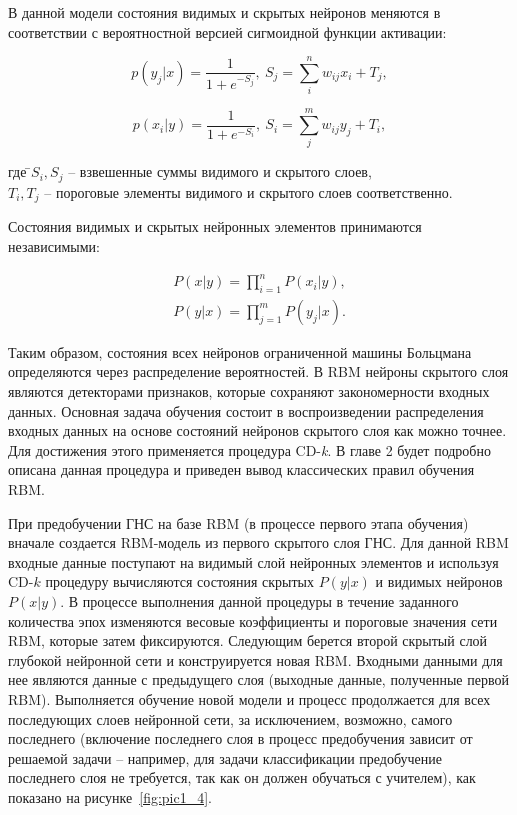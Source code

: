 В данной модели состояния видимых и скрытых нейронов меняются в соответствии с вероятностной версией сигмоидной функции активации:
	
\begin{equation}
	p(y_j\lvert x)=\frac{1}{1+e^{-S_j}},\ S_j=\sum_i^n w_{ij}x_i+T_j,
\end{equation}
	
\begin{equation}
	p(x_i\lvert y)=\frac{1}{1+e^{-S_i}},\ S_i=\sum_j^m w_{ij}y_j+T_i,
\end{equation}
\begin{tabbing}	
где \=$S_i, S_j$ -- взвешенные суммы видимого и скрытого слоев,\\
\>$T_i, T_j$ -- пороговые элементы видимого и скрытого слоев соответственно.
\end{tabbing}
	
Состояния видимых и скрытых нейронных элементов принимаются независимыми:
	
\begin{equation*}
\begin{aligned}
	P(x \lvert y) = \prod_{i=1}^n P(x_i \lvert y),\\
	P(y \lvert x) = \prod_{j=1}^m P(y_j \lvert x).
\end{aligned}	
\end{equation*}
	
Таким образом, состояния всех нейронов ограниченной машины Больцмана определяются через распределение вероятностей. В RBM нейроны скрытого слоя являются детекторами признаков, которые сохраняют закономерности входных данных. Основная задача обучения состоит в воспроизведении распределения входных данных на основе состояний нейронов скрытого слоя как можно точнее. Для достижения этого применяется процедура CD-\textit{k}. В главе 2 будет подробно описана данная процедура и приведен вывод классических правил обучения RBM. %

При предобучении ГНС на базе RBM (в процессе первого этапа обучения) вначале создается RBM-модель из первого скрытого слоя ГНС. Для данной RBM входные данные поступают на видимый слой нейронных элементов и используя CD-$k$ процедуру вычисляются состояния скрытых $P(y \lvert x)$ и видимых нейронов $P(x \lvert y)$. В процессе выполнения данной процедуры в течение заданного количества эпох изменяются весовые коэффициенты и пороговые значения сети RBM, которые затем фиксируются. Следующим берется второй скрытый слой глубокой нейронной сети и конструируется новая RBM. Входными данными для нее являются данные с предыдущего слоя (выходные данные, полученные первой RBM). Выполняется обучение новой модели и процесс продолжается для всех последующих слоев нейронной сети, за исключением, возможно, самого последнего (включение последнего слоя в процесс предобучения зависит от решаемой задачи -- например, для задачи классификации предобучение последнего слоя не требуется, так как он должен обучаться с учителем), как показано на рисунке~\ref{fig:pic1_4}. 

